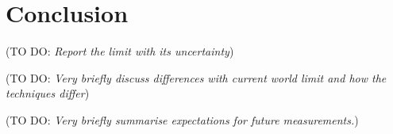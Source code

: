 \documentclass[12pt]{article}
\newcommand{\todo }[1]{({\color{red}\sc TO DO: \textit{#1}})}
\begin{document}









\section{Conclusion}
\todo{Report the limit with its uncertainty}

\todo{Very briefly discuss differences with current world limit and how the techniques differ}

\todo{Very briefly summarise expectations for future measurements.}



\end{document}
